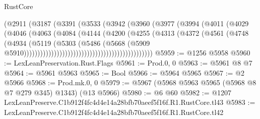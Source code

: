 \begin{lexlean}{RustCore}
\begin{coremodule}
                                              (@2911
                                                (@3187
                                                  (@3391
                                                    (@3533
                                                      (@3942
                                                        (@3960
                                                          (@3977
                                                            (@3994
                                                              (@4011
                                                                (@4029
                                                                  (@4046
                                                                    (@4063
                                                                      (@4084
                                                                        (@4144
                                                                          (@4200
                                                                            (@4255
                                                                              (@4313
                                                                                (@4372
                                                                                  (@4561
                                                                                    (@4748
                                                                                      (@4934
                                                                                        (@5119
                                                                                          (@5303
                                                                                            (@5486
                                                                                              (@5668
                                                                                                (@5909
                                                                                                  @5910)))))))))))))))))))))))))))))))))))))))))))))))
@5959 := @1256 @5958
@5960 := LexLeanPreservation.Rust.Flags
@5961 := Prod.{0, 0}
@5963 := @5961 @8 @7
@5964 := @5961 @5963
@5965 := Bool
@5966 := @5964 @5965
@5967 := @2 @5966
@5968 := Prod.mk.{0, 0}
@5979 := @5967 (@5968 @5963 @5965 (@5968 @8 @7 @279 @345) @1343) (@13 @5966)
@5980 := @6 @60
@5982 := @1207 LexLeanPreserve.C1b912f4fc4d4e14a28bfb70aeef5f16f.R1.RustCore.tl43
@5983 := LexLeanPreserve.C1b912f4fc4d4e14a28bfb70aeef5f16f.R1.RustCore.tl42

\end{coremodule}
\end{lexlean}
